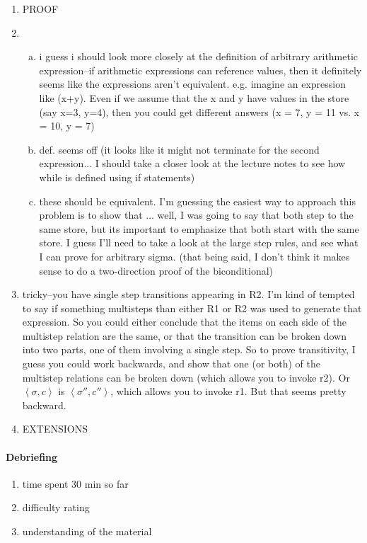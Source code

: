 \documentclass[10pt, oneside]{article}
\begin{document}
\begin{enumerate}[1.]
	\item PROOF
	\item 
	\begin{enumerate} [(a)]
		\item i guess i should look more closely at the definition of arbitrary arithmetic expression--if arithmetic expressions can reference values, then it definitely seems like the expressions aren't equivalent. e.g. imagine an expression like (x+y). Even if we assume that the x and y have values in the store (say x=3, y=4), then you could get different answers (x = 7, y = 11 vs. x = 10, y = 7) 
		\item def. seems off (it looks like it might not terminate for the second expression... I should take a closer look at the lecture notes to see how while is defined  using if statements)
		\item these should be equivalent. I'm guessing the easiest way to approach this problem is to show that ... well, I was going to say that both step to the same store, but its important to emphasize that both start with the same store. I guess I'll need to take a look at the large step rules, and see what I can prove for arbitrary sigma. (that being said, I don't think it makes sense to do a two-direction proof of the biconditional)
	\end{enumerate}
	\item tricky--you have single step transitions appearing in R2. I'm kind of tempted to say if something multisteps than either R1 or R2 was used to generate that expression. So you could either conclude that the items on each side of the multistep relation are the same, or that the transition can be broken down into two parts, one of them involving a single step. So to prove transitivity, I guess you could work backwards, and show that one (or both) of the multistep relations can be broken down (which allows you to invoke r2). Or $\left< \sigma, c \right>$ is $\left< \sigma'',c''\right>$, which allows you to invoke r1. But that seems pretty backward.
	\item EXTENSIONS
\end{enumerate}

\paragraph{Debriefing}
\begin{enumerate}
	\item time spent 30 min so far
	\item difficulty rating
	\item understanding of the material
\end{enumerate}
\end{document}
